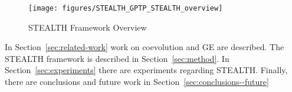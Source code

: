 \begin{figure}
  \centering
  \texttt{[image: figures/STEALTH\_GPTP\_STEALTH\_overview]}
  \caption{STEALTH Framework Overview}
  \label{fig:STEALTH_overview}
\end{figure}

In Section~\ref{sec:related-work} work on coevolution and GE are
described. The STEALTH framework is described in
Section~\ref{sec:method}. In Section~\ref{sec:experiments} there are
experiments regarding STEALTH. Finally, there are conclusions and
future work in Section~\ref{sec:conclusions--future}
